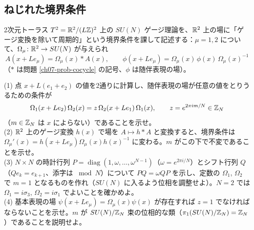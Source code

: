 \subsection{ねじれた境界条件}

\begin{problem}[難易度 D]\label{ch07-prob-thooft}
2次元トーラス $T^2=\mathbb{R}^2/(L\mathbb{Z})^2$ 上の $SU(N)$ ゲージ理論を、$\mathbb{R}^2$ 上の場に「ゲージ変換を除いて周期的」という境界条件を課して記述する：$\mu=1,2$ について、$\Omega_\mu\colon\mathbb{R}^2\to SU(N)$ が与えられ
\[
A(x+Le_\mu)=\Omega_\mu(x)\ast A(x),\qquad \phi(x+Le_\mu)=\Omega_\mu(x)\,\phi(x)\,\Omega_\mu(x)^{-1}
\]
（$\ast$ は問題 \ref{ch07-prob-cocycle} の記号、$\phi$ は随伴表現の場）。
\begin{center}
\end{center}
(1) 点 $x+L(e_1+e_2)$ の値を2通りに計算し、随伴表現の場が任意の値をとりうるための条件が
\[
\Omega_1(x+Le_2)\,\Omega_2(x)=z\,\Omega_2(x+Le_1)\,\Omega_1(x),\qquad z=e^{2\pi im/N}\in\mathbb{Z}_N
\]
（$m\in\mathbb{Z}_N$ は $x$ によらない）であることを示せ。\\
(2) $\mathbb{R}^2$ 上のゲージ変換 $h(x)$ で場を $A\mapsto h\ast A$ と変換すると、境界条件は $\Omega_\mu'(x)=h(x+Le_\mu)\Omega_\mu(x)h(x)^{-1}$ に変わる。$m$ がこの下で不変であることを示せ。\\
(3) $N\times N$ の時計行列 $P=\operatorname{diag}(1,\omega,\dots,\omega^{N-1})$（$\omega=e^{2\pi i/N}$）とシフト行列 $Q$（$Qe_k=e_{k+1}$、添字は $\bmod N$）について $PQ=\omega QP$ を示し、定数の $\Omega_1$, $\Omega_2$ で $m=1$ となるものを作れ（$SU(N)$ に入るよう位相を調整せよ）。$N=2$ では $\Omega_1=i\sigma_3$, $\Omega_2=i\sigma_1$ でよいことを確かめよ。\\
(4) 基本表現の場 $\psi(x+Le_\mu)=\Omega_\mu(x)\psi(x)$ が存在すれば $z=1$ でなければならないことを示せ。$m$ が $SU(N)/\mathbb{Z}_N$ 束の位相的な類（$\pi_1(SU(N)/\mathbb{Z}_N)=\mathbb{Z}_N$）であることを説明せよ。
\end{problem}

